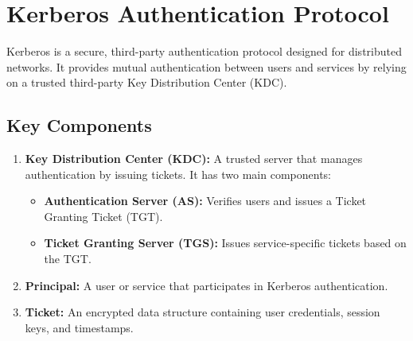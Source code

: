 \documentclass[11pt]{article}
\begin{document}
\section{Kerberos Authentication Protocol}
Kerberos is a secure, third-party authentication protocol designed for distributed networks. It provides mutual authentication between users and services by relying on a trusted third-party Key Distribution Center (KDC).

\subsection{Key Components}
\begin{enumerate}
\item \textbf{Key Distribution Center (KDC):} A trusted server that manages authentication by issuing tickets. It has two main components:
\begin{itemize}
\item \textbf{Authentication Server (AS):} Verifies users and issues a Ticket Granting Ticket (TGT).
\item \textbf{Ticket Granting Server (TGS):} Issues service-specific tickets based on the TGT.
\end{itemize}
\item \textbf{Principal:} A user or service that participates in Kerberos authentication.
\item \textbf{Ticket:} An encrypted data structure containing user credentials, session keys, and timestamps.
\end{enumerate}
\end{document}
